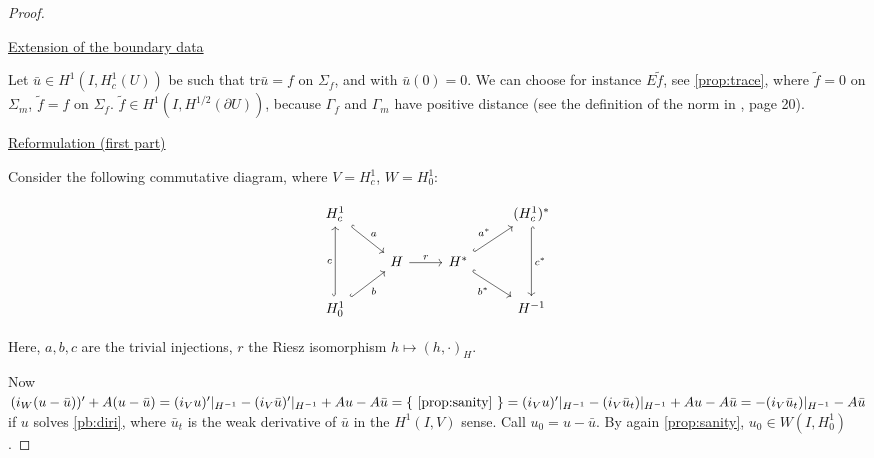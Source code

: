 \documentclass[english,a4paper,10pt,oneside]{scrbook}	%
\theoremstyle{break}
\newenvironment{mproof}[1][\proofname]{%
  \begin{proof}[#1]$ $\par\nobreak\ignorespaces
}{%
  \end{proof}
}
\renewcommand*{\proofname}{Proof}
\theoremstyle{remark}
\newcommand{\tr}{\text{tr}}
\newcommand{\ind}[1]{\{\text{ #1 }\}}
\begin{document}
\begin{mproof}

\underline{Extension of the boundary data}

Let $\bar{u}\in H^1(I,H^1_c(U))$ be such that $\tr \bar{u} =f$ on $\Sigma_f$, and with $\bar{u}(0)=0$. We can choose for instance $E\tilde{f}$, see \cref{prop:trace}, where $\tilde{f}=0$ on $\Sigma_m$, $\tilde{f}=f$ on $\Sigma_f$. $\tilde{f} \in H^1(I,H^{1/2}(\partial U))$, because $\Gamma_f$ and $\Gamma_m$ have positive distance (see the definition of the norm in \cite{grisvard}, page 20).  

\underline{Reformulation (first part)}

Consider the following commutative diagram, where $V = H^1_c$, $W=H^1_0$:

\[\begin{tikzcd}
	{H^1_c} &&& {(H^1_c)^*} \\
	& H & {H^*} \\
	{H^1_0} &&& {H^{-1}}
	\arrow["c", hook, from=3-1, to=1-1]
	\arrow["a", hook, from=1-1, to=2-2]
	\arrow["b"', hook, from=3-1, to=2-2]
	\arrow["{a^*}", hook, from=2-3, to=1-4]
	\arrow["r", from=2-2, to=2-3]
	\arrow["{b^*}"', hook, from=2-3, to=3-4]
	\arrow["{c^*}", hook, from=1-4, to=3-4]
\end{tikzcd}\]

Here, $a,b,c$ are the trivial injections, $r$ the Riesz isomorphism $h\mapsto(h,\cdot)_H$. 

Now $(i_W (u-\bar{u}) )'+A(u - \bar{u}) = (i_Vu)'|_{H^{-1}}-(i_V\bar{u})'|_{H^{-1}}+Au - A\bar{u} = \ind{\cref{prop:sanity}}  = (i_Vu)'|_{H^{-1}}-(i_V\bar{u}_t)|_{H^{-1}}+Au - A\bar{u} = -(i_V\bar{u}_t)|_{H^{-1}}- A\bar{u}$ if $u$ solves \cref{pb:diri}, where $\bar{u}_t$ is the weak derivative of $\bar{u}$ in the $H^1(I,V)$ sense. Call $u_0 = u-\bar{u}$. By again \cref{prop:sanity}, $u_0 \in W(I,H^1_0)$.

%
%


\end{mproof}
\end{document}
